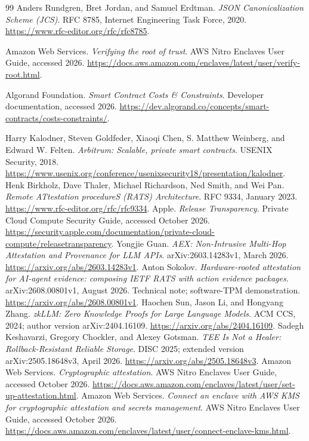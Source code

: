 \documentclass[10pt]{article}
\begin{document}
\begin{thebibliography}{99}
Anders Rundgren, Bret Jordan, and Samuel Erdtman.
\newblock \emph{JSON Canonicalization Scheme (JCS)}.
\newblock RFC 8785, Internet Engineering Task Force, 2020.
\newblock \url{https://www.rfc-editor.org/rfc/rfc8785}.

Amazon Web Services.
\newblock \emph{Verifying the root of trust}.
\newblock AWS Nitro Enclaves User Guide, accessed 2026.
\newblock \url{https://docs.aws.amazon.com/enclaves/latest/user/verify-root.html}.

Algorand Foundation.
\newblock \emph{Smart Contract Costs \& Constraints}.
\newblock Developer documentation, accessed 2026.
\newblock \url{https://dev.algorand.co/concepts/smart-contracts/costs-constraints/}.

Harry Kalodner, Steven Goldfeder, Xiaoqi Chen, S. Matthew Weinberg, and Edward W. Felten.
\newblock \emph{Arbitrum: Scalable, private smart contracts}.
\newblock USENIX Security, 2018.
\newblock \url{https://www.usenix.org/conference/usenixsecurity18/presentation/kalodner}.
Henk Birkholz, Dave Thaler, Michael Richardson, Ned Smith, and Wei Pan.
\newblock \emph{Remote ATtestation procedureS (RATS) Architecture}.
\newblock RFC 9334, January 2023.
\newblock \url{https://www.rfc-editor.org/rfc/rfc9334}.
Apple.
\newblock \emph{Release Transparency}.
\newblock Private Cloud Compute Security Guide, accessed October 2026.
\newblock \url{https://security.apple.com/documentation/private-cloud-compute/releasetransparency}.
Yongjie Guan.
\newblock \emph{AEX: Non-Intrusive Multi-Hop Attestation and Provenance for LLM APIs}.
\newblock arXiv:2603.14283v1, March 2026.
\newblock \url{https://arxiv.org/abs/2603.14283v1}.
Anton Sokolov.
\newblock \emph{Hardware-rooted attestation for AI-agent evidence: composing IETF RATS with action evidence packages}.
\newblock arXiv:2608.00801v1, August 2026. Technical note; software-TPM demonstration.
\newblock \url{https://arxiv.org/abs/2608.00801v1}.
Haochen Sun, Jason Li, and Hongyang Zhang.
\newblock \emph{zkLLM: Zero Knowledge Proofs for Large Language Models}.
\newblock ACM CCS, 2024; author version arXiv:2404.16109.
\newblock \url{https://arxiv.org/abs/2404.16109}.
Sadegh Keshavarzi, Gregory Chockler, and Alexey Gotsman.
\newblock \emph{TEE Is Not a Healer: Rollback-Resistant Reliable Storage}.
\newblock DISC 2025; extended version arXiv:2505.18648v3, April 2026.
\newblock \url{https://arxiv.org/abs/2505.18648v3}.
Amazon Web Services.
\newblock \emph{Cryptographic attestation}.
\newblock AWS Nitro Enclaves User Guide, accessed October 2026.
\newblock \url{https://docs.aws.amazon.com/enclaves/latest/user/set-up-attestation.html}.
Amazon Web Services.
\newblock \emph{Connect an enclave with AWS KMS for cryptographic attestation and secrets management}.
\newblock AWS Nitro Enclaves User Guide, accessed October 2026.
\newblock \url{https://docs.aws.amazon.com/enclaves/latest/user/connect-enclave-kms.html}.


\end{thebibliography}
\end{document}

